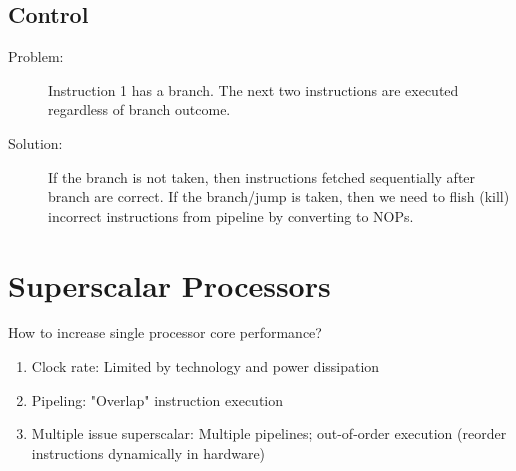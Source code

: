 \subsection{Control}
\begin{description}
	\item[Problem:] Instruction 1 has a branch. The next two instructions are executed regardless of branch outcome.
	\item[Solution:] If the branch is not taken, then instructions fetched sequentially after branch are correct. If the branch/jump is taken, then we need to flish (kill) incorrect instructions from pipeline by converting to NOPs.
\end{description}

\section{Superscalar Processors}
How to increase single processor core performance?
\begin{enumerate}
    \item Clock rate: Limited by technology and power dissipation
    \item Pipeling: "Overlap" instruction execution
    \item Multiple issue superscalar: Multiple pipelines; out-of-order execution (reorder instructions dynamically in hardware)
\end{enumerate}